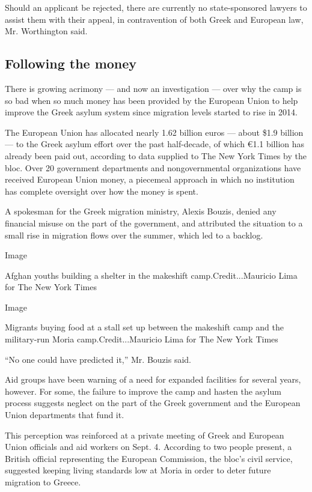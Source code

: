 Should an applicant be rejected, there are currently no state-sponsored
lawyers to assist them with their appeal, in contravention of both Greek
and European law, Mr. Worthington said.

\hypertarget{following-the-money}{%
\subsection{Following the money}\label{following-the-money}}

There is growing acrimony --- and now an investigation --- over why the
camp is so bad when so much money has been provided by the European
Union to help improve the Greek asylum system since migration levels
started to rise in 2014.

The European Union has allocated nearly 1.62 billion euros --- about
\$1.9 billion --- to the Greek asylum effort over the past half-decade,
of which €1.1 billion has already been paid out, according to data
supplied to The New York Times by the bloc. Over 20 government
departments and nongovernmental organizations have received European
Union money, a piecemeal approach in which no institution has complete
oversight over how the money is spent.

A spokesman for the Greek migration ministry, Alexis Bouzis, denied any
financial misuse on the part of the government, and attributed the
situation to a small rise in migration flows over the summer, which led
to a backlog.

Image

Afghan youths building a shelter in the makeshift camp.Credit...Mauricio
Lima for The New York Times

Image

Migrants buying food at a stall set up between the makeshift camp and
the military-run Moria camp.Credit...Mauricio Lima for The New York
Times

``No one could have predicted it,'' Mr. Bouzis said.

Aid groups have been warning of a need for expanded facilities for
several years, however. For some, the failure to improve the camp and
hasten the asylum process suggests neglect on the part of the Greek
government and the European Union departments that fund it.

This perception was reinforced at a private meeting of Greek and
European Union officials and aid workers on Sept. 4. According to two
people present, a British official representing the European Commission,
the bloc's civil service, suggested keeping living standards low at
Moria in order to deter future migration to Greece.

